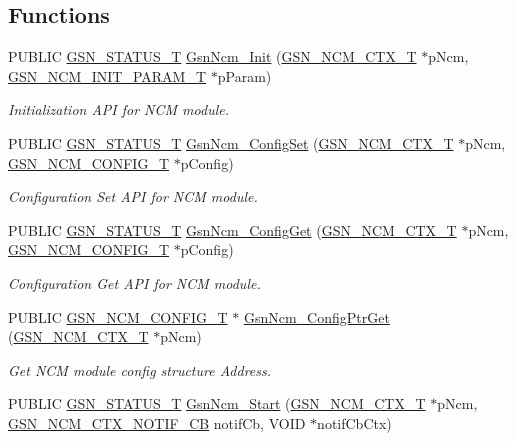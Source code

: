 \subsection*{Functions}
\begin{DoxyCompactItemize}
\item 
PUBLIC \hyperlink{a00659_gae36517c0f5872426a7034c9551eb96ac}{GSN\_\-STATUS\_\-T} \hyperlink{a00688_ga48b1340485aa02c120f63c82f90cca3e}{GsnNcm\_\-Init} (\hyperlink{a00158}{GSN\_\-NCM\_\-CTX\_\-T} $\ast$pNcm, \hyperlink{a00159}{GSN\_\-NCM\_\-INIT\_\-PARAM\_\-T} $\ast$pParam)
\begin{DoxyCompactList}\small\item\em Initialization API for NCM module. \end{DoxyCompactList}\item 
PUBLIC \hyperlink{a00659_gae36517c0f5872426a7034c9551eb96ac}{GSN\_\-STATUS\_\-T} \hyperlink{a00688_gac8d88feff4bacf5d5acece3f127c937b}{GsnNcm\_\-ConfigSet} (\hyperlink{a00158}{GSN\_\-NCM\_\-CTX\_\-T} $\ast$pNcm, \hyperlink{a00157}{GSN\_\-NCM\_\-CONFIG\_\-T} $\ast$pConfig)
\begin{DoxyCompactList}\small\item\em Configuration Set API for NCM module. \end{DoxyCompactList}\item 
PUBLIC \hyperlink{a00659_gae36517c0f5872426a7034c9551eb96ac}{GSN\_\-STATUS\_\-T} \hyperlink{a00688_ga54ecf725bc9a7b85c5cd9b57ecfe8ecb}{GsnNcm\_\-ConfigGet} (\hyperlink{a00158}{GSN\_\-NCM\_\-CTX\_\-T} $\ast$pNcm, \hyperlink{a00157}{GSN\_\-NCM\_\-CONFIG\_\-T} $\ast$pConfig)
\begin{DoxyCompactList}\small\item\em Configuration Get API for NCM module. \end{DoxyCompactList}\item 
PUBLIC \hyperlink{a00157}{GSN\_\-NCM\_\-CONFIG\_\-T} $\ast$ \hyperlink{a00688_ga8a003a052b151aeb2bd31b77912a1f13}{GsnNcm\_\-ConfigPtrGet} (\hyperlink{a00158}{GSN\_\-NCM\_\-CTX\_\-T} $\ast$pNcm)
\begin{DoxyCompactList}\small\item\em Get NCM module config structure Address. \end{DoxyCompactList}\item 
PUBLIC \hyperlink{a00659_gae36517c0f5872426a7034c9551eb96ac}{GSN\_\-STATUS\_\-T} \hyperlink{a00688_ga2250bc85d7e05785da38ecbbd3f3e538}{GsnNcm\_\-Start} (\hyperlink{a00158}{GSN\_\-NCM\_\-CTX\_\-T} $\ast$pNcm, \hyperlink{a00668_ga9fb71d435556873549a9da8758741a14}{GSN\_\-NCM\_\-CTX\_\-NOTIF\_\-CB} notifCb, VOID $\ast$notifCbCtx)

\end{DoxyCompactItemize}

